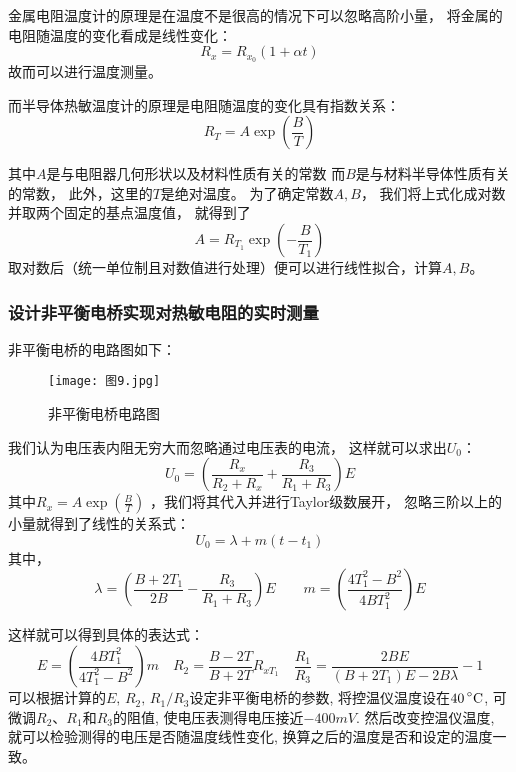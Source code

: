 \documentclass[11pt]{article}
\begin{document}
金属电阻温度计的原理是在温度不是很高的情况下可以忽略高阶小量，
将金属的电阻随温度的变化看成是线性变化：
\begin{displaymath}
    R_x=R_{x_0}(1+\alpha t)
\end{displaymath}
故而可以进行温度测量。

而半导体热敏温度计的原理是电阻随温度的变化具有指数关系：
\begin{displaymath}
    R_T=A\exp \left(\frac{B}{T}\right)
\end{displaymath}

其中$A$是与电阻器几何形状以及材料性质有关的常数
而$B$是与材料半导体性质有关的常数，
此外，这里的$T$是绝对温度。
为了确定常数$A,B$，
我们将上式化成对数并取两个固定的基点温度值，
就得到了
\begin{displaymath}
    A=R_{T_1}\exp \left(-\frac{B}{T_1}\right)
\end{displaymath}
取对数后（统一单位制且对数值进行处理）便可以进行线性拟合，计算$A,B$。



\subsubsection{设计非平衡电桥实现对热敏电阻的实时测量}

非平衡电桥的电路图如下：

\begin{figure}[H]
    \centering
    \texttt{[image: 图9.jpg]}
    \caption{非平衡电桥电路图}
\end{figure}

我们认为电压表内阻无穷大而忽略通过电压表的电流，
这样就可以求出$U_0$：
\begin{displaymath}
    U_0=\left( \frac{R_x}{R_2+R_x}+\frac{R_3}{R_1+R_3}\right)E
\end{displaymath}
其中$R_x=A\exp \left(\frac{B}{T}\right)$
，我们将其代入并进行Taylor级数展开，
忽略三阶以上的小量就得到了线性的关系式：
\begin{displaymath}
    U_0=\lambda+m(t-t_1)
\end{displaymath}
其中，
\begin{displaymath}
    \lambda=\left(\frac{B+2T_1}{2B}-\frac{R_3}{R_1+R_3}\right)E\qquad m
    =\left(\frac{4T_1^2-B^2}{4BT_1^2}\right)E
\end{displaymath}

这样就可以得到具体的表达式：
\begin{displaymath}
    E=\left(\frac{4BT_1^2}{4T_1^2-B^2}\right)m
    \quad R_2=\frac{B-2T}{B+2T}R_{xT_1}
    \quad \frac{R_1}{R_3}=\frac{2BE}{(B+2T_1)E-2B\lambda}-1
\end{displaymath}
可以根据计算的$E ,\, R_2 ,\, R_1/R_3$设定非平衡电桥的参数, 
将控温仪温度设在$40\mathop{}\!\mathrm{\prescript{\circ}{}C}$, 可微调$R_2$、$R_1$和$R_3$的阻值, 
使电压表测得电压接近$-400\unit{mV}$. 
然后改变控温仪温度, 
就可以检验测得的电压是否随温度线性变化, 换算之后的温度是否和设定的温度一致。 
\end{document}
